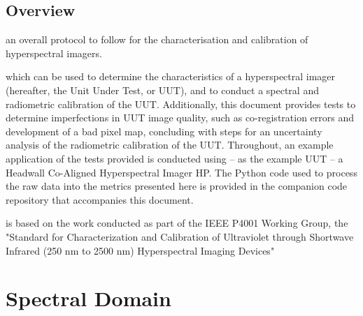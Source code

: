\documentclass[nohyper,nobib]{tufte-book}
\newcommand{\monthyear}{%
  \ifcase\month\or January\or February\or March\or April\or May\or June\or
  July\or August\or September\or October\or November\or
  December\fi\space\number\year
}
\begin{document}

\tableofcontents

\listoffigures

\listoftables



\cleardoublepage
\chapter*{Overview}

 an overall protocol to follow for the characterisation and calibration of hyperspectral imagers. 

 which can be used to determine the characteristics of a hyperspectral imager (hereafter, the Unit Under Test, or UUT), and to conduct a spectral and radiometric calibration of the UUT. 
Additionally, this document provides tests to determine imperfections in UUT image quality, such as co-registration errors and development of a bad pixel map,  concluding with steps for an uncertainty analysis of the radiometric calibration of the UUT. 
Throughout, an example application of the tests provided is conducted using -- as the example UUT -- a Headwall Co-Aligned Hyperspectral Imager HP.
The Python code used to process the raw data into the metrics presented here is provided in the companion code repository that accompanies this document.

 is based on the work conducted as part of the IEEE P4001 Working Group, the "Standard for Characterization and Calibration of Ultraviolet through Shortwave Infrared (250 nm to 2500 nm) Hyperspectral Imaging Devices" \cite{Durell20019} \cite{Ientilucci2022}



\mainmatter

\part{Spectral Domain}
\end{document}
